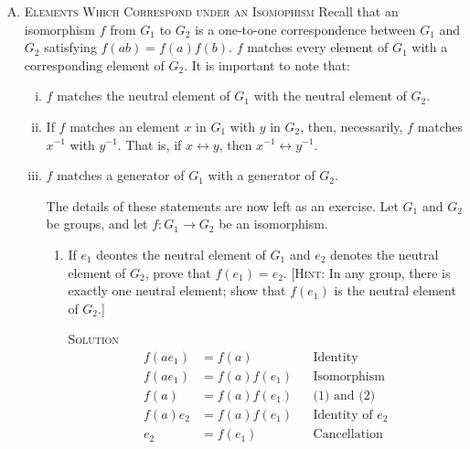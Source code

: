 \documentclass[twoside]{amsart}
\newcommand{\solution}{\textsc{Solution}\xspace}
\newcommand{\blank}{\vspace{5pt}}
\begin{document}
\begin{enumerate}[A.]
\begin{enumerate}[1]
   \end{enumerate}

   \item \textsc{Elements Which Correspond under an Isomophism}
   Recall that an isomorphism $f$ from $G_1$ to $G_2$ is a one-to-one
   correspondence between $G_1$ and $G_2$ satisfying $f(ab)=f(a)f(b)$.
   $f$ matches every element of $G_1$ with a corresponding element of
   $G_2$. It is important to note that:
   \blank

   \begin{enumerate}[(i)]
      \item $f$ matches the neutral element of $G_1$ with the neutral
      element of $G_2$.

      \item If $f$ matches an element $x$ in $G_1$ with $y$ in $G_2$,
      then, necessarily, $f$ matches $x^{-1}$ with $y^{-1}$.
      That is, if $x \leftrightarrow y$, then $x^{-1} \leftrightarrow
      y^{-1}$.

      \item $f$ matches a generator of $G_1$ with a generator of $G_2$.

      \blank
      \begin{center}
      \end{center}
      \blank

      The details of these statements are now left as an exercise. Let 
      $G_1$ and $G_2$ be groups, and let $f : G_1 \to G_2$ be an 
      isomorphism.

      \begin{enumerate}[1.]
         \item If $e_1$ deontes the neutral element of $G_1$ and $e_2$
         denotes the neutral element of $G_2$, prove that $f(e_1)=e_2$.
         [\textsc{Hint}: In any group, there is exactly one neutral
         element; show that $f(e_1)$ is the neutral element of $G_2$.]

         \setcounter{equation}{0}
         \blank \noindent \solution 
         \begin{align}
            f(ae_1) &= f(a)   && \text{Identity}\\
            f(ae_1) &= f(a)f(e_1) && \text{Isomorphism}\\
            f(a)    &= f(a)f(e_1) && \text{(1) and (2)}\\
            f(a)e_2 &= f(a)f(e_1) && \text{Identity of $e_2$}\\
                e_2 &= f(e_1)     && \text{Cancellation}
         \end{align}


\end{enumerate}
\end{enumerate}
\end{enumerate}
\end{document}
